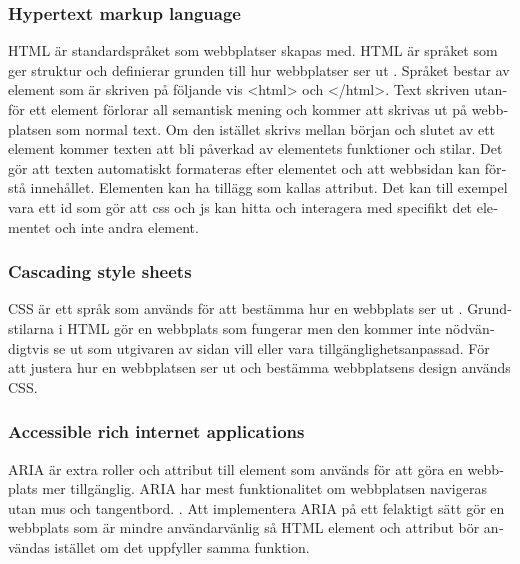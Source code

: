 \documentclass[11p]{article}
\begin{document}
\begin{otherlanguage}{swedish}
    \subsubsection{Hypertext markup language}
    HTML är standardspråket som webbplatser skapas med.
    HTML är språket som ger struktur och definierar grunden till hur webbplatser ser ut \parencite{HTML}.
    Språket bestar av element som är skriven på följande vis <html> och </html>.
    Text skriven utanför ett element förlorar all semantisk mening och kommer att skrivas ut på webbplatsen som normal text.
    Om den istället skrivs mellan början och slutet av ett element kommer texten att bli påverkad av elementets funktioner och stilar.
    Det gör att texten automatiskt formateras efter elementet och att webbsidan kan förstå innehållet.
    Elementen kan ha tillägg som kallas attribut.
    Det kan till exempel vara ett id som gör att css och js kan hitta och interagera med specifikt det elementet och inte andra element.


    \subsubsection{Cascading style sheets}
    CSS är ett språk som används för att bestämma hur en webbplats ser ut \parencite{CSS}.
    Grundstilarna i HTML gör en webbplats som fungerar men den kommer inte nödvändigtvis se ut som utgivaren av sidan vill eller vara tillgänglighetsanpassad.
    För att justera hur en webbplatsen ser ut och bestämma webbplatsens design används CSS.

    \subsubsection{Accessible rich internet applications}
    ARIA är extra roller och attribut till element som används för att göra en webbplats mer tillgänglig.
    ARIA har mest funktionalitet om webbplatsen navigeras utan mus och tangentbord. \parencite{ARIA}.
    Att implementera ARIA på ett felaktigt sätt gör en webbplats som är mindre användarvänlig så HTML element och attribut bör användas istället om det uppfyller samma funktion.
    

\end{otherlanguage}
\end{document}
